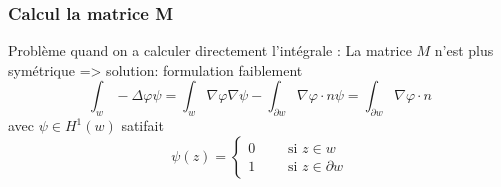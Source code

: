 \begin{frame}
\frametitle{Calcul la matrice M}
Probl\`eme quand on a calculer directement l'int\'egrale : La matrice $M$ n'est plus sym\'etrique 
=> solution: formulation faiblement
\begin{equation}
\int_w -\Delta\varphi \psi =\int_w \nabla\varphi\nabla\psi - \int_{\partial w} \nabla\varphi\cdot n \psi =\int_{\partial w} \nabla\varphi\cdot n 
\end{equation}
avec $\psi \in H^1(w)$ satifait 
\begin{equation}
\psi(z) =
\begin{cases}
0 \qquad \text{ si } z\in w \\
1 \qquad \text{ si } z\in \partial w
\end{cases}
\end{equation} 


\end{frame} 
